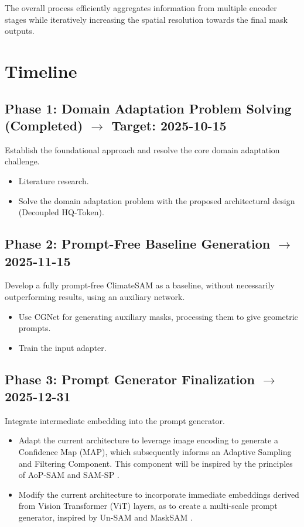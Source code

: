 \vspace{-1mm}

\noindent The overall process efficiently aggregates information from multiple encoder stages while iteratively increasing the spatial resolution towards the final mask outputs.


\section{Timeline}
\subsection*{Phase 1: Domain Adaptation Problem Solving (Completed) $\mathbf{\rightarrow}$ Target: 2025-10-15}
Establish the foundational approach and resolve the core domain adaptation challenge.
\begin{itemize}
    \item Literature research.
    \item Solve the domain adaptation problem with the proposed architectural design (Decoupled HQ-Token).
\end{itemize}

\subsection*{Phase 2: Prompt-Free Baseline Generation $\mathbf{\rightarrow}$ 2025-11-15}
Develop a fully prompt-free ClimateSAM as a baseline, without necessarily outperforming results, using an auxiliary network.
\begin{itemize}
    \item Use CGNet for generating auxiliary masks, processing them to give geometric prompts.
    \item Train the input adapter.
\end{itemize}

\subsection*{Phase 3: Prompt Generator Finalization $\mathbf{\rightarrow}$ 2025-12-31}
Integrate intermediate embedding into the prompt generator.
\begin{itemize}
    \item Adapt the current architecture to leverage image encoding to generate a Confidence Map (MAP), which subsequently informs an Adaptive Sampling and Filtering Component. This component will be inspired by the principles of AoP-SAM and SAM-SP \cite{chen2025aop, zhou2024sam}.
    \item Modify the current architecture to incorporate immediate embeddings derived from Vision Transformer (ViT) layers, as to create a multi-scale prompt generator, inspired by Un-SAM and MaskSAM \cite{xie2025self, xie2024masksam}.
\end{itemize}

